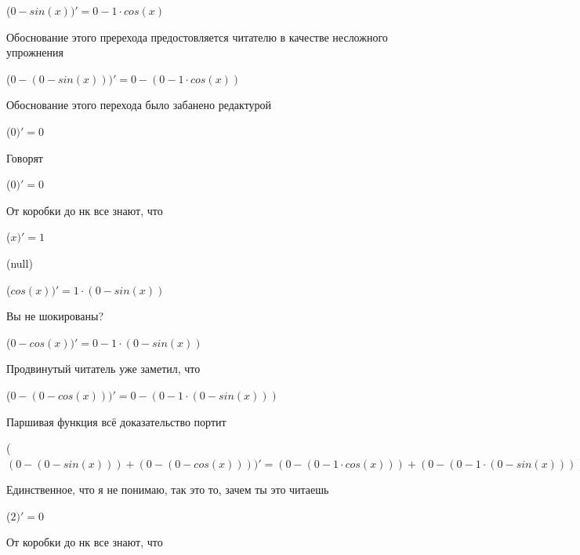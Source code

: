 \documentclass[12pt,a4paper,fleqn]{article}
\begin{document}
\begin{center}
\begin{center}
\begin{center}
\begin{center}
\begin{center}
\begin{center}
\begin{center}
\begin{center}
\begin{center}
\begin{center}
\begin{center}
\begin{center}
\begin{center}
\begin{center}
\begin{center}
\begin{center}
\begin{center}
\begin{center}
\begin{center}
\begin{center}
\begin{center}
\begin{center}
\begin{center}
\begin{center}
\begin{center}
\begin{center}
\begin{center}
\begin{center}
\begin{center}
\begin{center}
\begin{center}
\begin{center}
\begin{center}
\begin{center}
\begin{center}
 ($0-sin(x))'
  = 0-1 \cdot cos(x)$\end{center}
Обоснование этого пререхода предостовляется читателю в качестве несложного упрожнения

\begin{center}
 ($0-(0-sin(x)))'
  = 0-(0-1 \cdot cos(x))$\end{center}
Обоснование этого перехода было забанено редактурой

\begin{center}
 ($0)'
  = 0$\end{center}
Говорят

\begin{center}
 ($0)'
  = 0$\end{center}
От коробки до нк все знают, что

\begin{center}
 ($x)'
  = 1$\end{center}
(null)\cite{link4}

\begin{center}
 ($cos(x))'
  = 1 \cdot (0-sin(x))$\end{center}
Вы не шокированы?\cite{link3}

\begin{center}
 ($0-cos(x))'
  = 0-1 \cdot (0-sin(x))$\end{center}
Продвинутый читатель уже заметил, что

\begin{center}
 ($0-(0-cos(x)))'
  = 0-(0-1 \cdot (0-sin(x)))$\end{center}
Паршивая функция всё доказательство портит\cite{link2}

\begin{center}
 ($(0-(0-sin(x)))+(0-(0-cos(x))))'
  = (0-(0-1 \cdot cos(x)))+(0-(0-1 \cdot (0-sin(x))))$\end{center}
Единственное, что я не понимаю, так это то, зачем ты это читаешь

\begin{center}
 ($2)'
  = 0$\end{center}
От коробки до нк все знают, что


\end{center}
\end{center}
\end{center}
\end{center}
\end{center}
\end{center}
\end{center}
\end{center}
\end{center}
\end{center}
\end{center}
\end{center}
\end{center}
\end{center}
\end{center}
\end{center}
\end{center}
\end{center}
\end{center}
\end{center}
\end{center}
\end{center}
\end{center}
\end{center}
\end{center}
\end{center}
\end{center}
\end{center}
\end{center}
\end{center}
\end{center}
\end{center}
\end{center}
\end{center}
\end{document}
